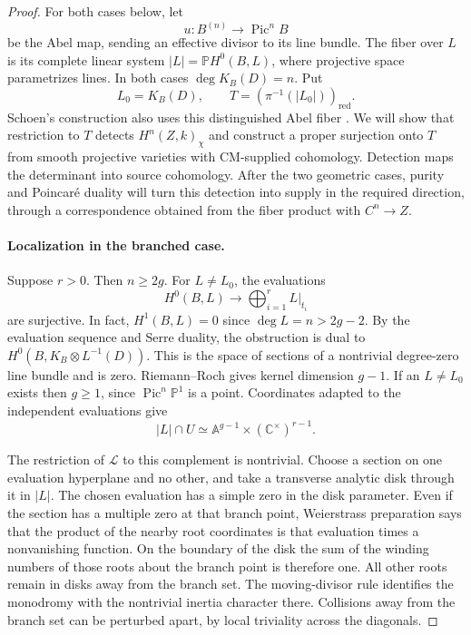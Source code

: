 \documentclass[11pt]{article}
\newcommand{\C}{\mathbb C}
\theoremstyle{plain}
\theoremstyle{definition}
\theoremstyle{remark}
\numberwithin{equation}{section}
\begin{document}
\begin{proof}
For both cases below, let
\[
 u:B^{(n)}\longrightarrow\operatorname{Pic}^n B
\]
be the Abel map, sending an effective divisor to its line bundle.
The fiber over $L$ is its complete linear system
$|L|=\mathbb P H^0(B,L)$, where projective space parametrizes
lines.  In both cases $\deg K_B(D)=n$.  Put
\[
 L_0=K_B(D),\qquad
 T=(\pi^{-1}(|L_0|))_{\mathrm{red}}.
\]
Schoen's construction also uses this distinguished Abel fiber
\cite[Section~2, pp.~12--13]{Schoen}.
We will show that restriction to $T$ detects $H^n(Z,k)_\chi$
and construct a proper surjection onto $T$ from smooth projective
varieties with CM-supplied cohomology.  Detection maps the determinant
into source cohomology.  After the two geometric cases, purity and
Poincar\'e duality will turn this detection into supply in the required
direction, through a correspondence obtained from the fiber product
with $C^n\to Z$.

\paragraph{Localization in the branched case.}
Suppose $r>0$.  Then $n\ge2g$.  For $L\ne L_0$, the evaluations
\begin{equation}
 \label{p4:eq:cyclic-evaluations}
 H^0(B,L)\longrightarrow\bigoplus_{i=1}^r L|_{t_i}
\end{equation}
are surjective.  In fact, $H^1(B,L)=0$ since
$\deg L=n>2g-2$.  By the evaluation sequence and Serre duality,
the obstruction is dual to
$H^0(B,K_B\otimes L^{-1}(D))$.  This is the space of sections
of a nontrivial degree-zero line bundle and is zero.
Riemann--Roch gives kernel dimension $g-1$.
If an $L\ne L_0$ exists then $g\ge1$, since
$\operatorname{Pic}^n\mathbb P^1$ is a point.
Coordinates adapted to the independent evaluations give
\begin{equation}
 \label{p4:eq:cyclic-generic-complement}
 |L|\cap U\simeq\mathbb A^{g-1}\times(\C^\times)^{r-1}.
\end{equation}

The restriction of $\mathcal L$ to this complement is nontrivial.
Choose a section on one evaluation hyperplane and no other,
and take a transverse analytic disk through it in $|L|$.
The chosen evaluation has a simple zero in the disk parameter.
Even if the section has a multiple zero at that branch point,
Weierstrass preparation says that the product of the nearby
root coordinates is that evaluation times a nonvanishing
function.  On the boundary of the disk the sum of the winding
numbers of those roots about the branch point is therefore one.
All other roots remain in disks away from the branch set.
The moving-divisor rule identifies the monodromy with the
nontrivial inertia character there.  Collisions away from
the branch set can be perturbed apart, by local triviality
across the diagonals.


\end{proof}
\end{document}
